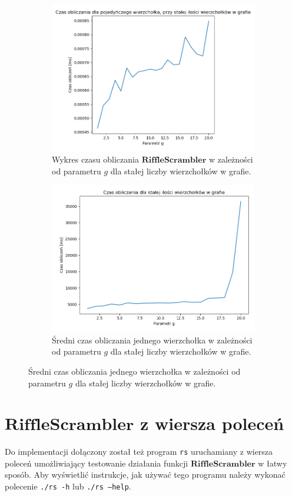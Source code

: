 \begin{figure}
\begin{subfigure}{0.5\textwidth}
		\includegraphics[width=\textwidth]{bench_5.png}
		\centering
		\caption{Wykres czasu obliczania $\mathbf{RiffleScrambler}$ w zależności od parametru $g$ dla stałej liczby wierzchołków w grafie.}
		\label{impl::b5}
	\end{subfigure}
	\begin{subfigure}{0.5\textwidth}
		\includegraphics[width=\textwidth]{bench_6.png}
		\centering
		\caption{Średni czas obliczania jednego wierzchołka w zależności od parametru $g$ dla stałej liczby wierzchołków w grafie.}
		\label{impl::b6}
	\end{subfigure}

\end{figure}

\section{$\mathbf{RiffleScrambler}$ z wiersza poleceń}
Do implementacji dołączony został też program \texttt{rs} uruchamiany z wiersza poleceń umożliwiający testowanie działania funkcji $\mathbf{RiffleScrambler}$ w łatwy sposób.
Aby wyświetlić instrukcje, jak używać tego programu należy wykonać polecenie \texttt{./rs -h} lub \texttt{./rs --help}.


